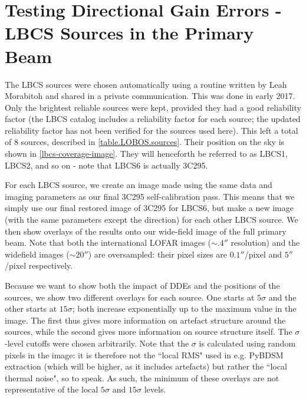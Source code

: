 \section{Testing Directional Gain Errors - LBCS Sources in the Primary Beam}\label{section.decorr}

\pg
The LBCS sources were chosen automatically using a routine written by Leah Morabitoh and shared in a private communication. This was done in early 2017. Only the brightest reliable sources were kept, provided they had a good reliability factor (the LBCS catalog includes a reliability factor for each source; the updated reliability factor has not been verified for the sources used here). This left a total of 8 sources, described in \cref{table.LOBOS.sources}. Their position on the sky is shown in \cref{lbcs-coverage-image}. They will henceforth be referred to as LBCS1, LBCS2, and so on - note that LBCS6 is actually 3C295.



\pg
For each LBCS source, we create an image made using the same data and imaging parameters as our final 3C295 self-calibration pass. This means that we simply use our final restored image of 3C295 for LBCS6, but make a new image (with the same parameters except the direction) for each other LBCS source. We then show overlays of the results onto our wide-field image of the full primary beam. Note that both the international LOFAR images ($\sim.4''$ resolution) and the widefield images ($\sim20''$) are oversampled: their pixel sizes are $0.1''$/pixel and $5''$/pixel respectively.

\pg
Because we want to show both the impact of DDEs and the positions of the sources, we show two different overlays for each source. One starts at $5\sigma$ and the other starts at $15\sigma$; both increase exponentially up to the maximum value in the image. The first thus gives more information on artefact structure around the sources, while the second gives more information on source structure itself. The $\sigma$-level cutoffs were chosen arbitrarily. Note that the $\sigma$ is calculated using random pixels in the image: it is therefore not the ``local RMS" used in e.g. PyBDSM extraction (which will be higher, as it includes artefacts) but rather the ``local thermal noise", so to speak. As such, the minimum of these overlays are not representative of the local $5\sigma$ and $15\sigma$ levels.

